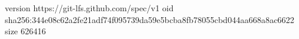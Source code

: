 version https://git-lfs.github.com/spec/v1
oid sha256:344e08c62a2fe21adf74f095739da59e5bcba8fb78055cbd044aa668a8ac6622
size 626416
